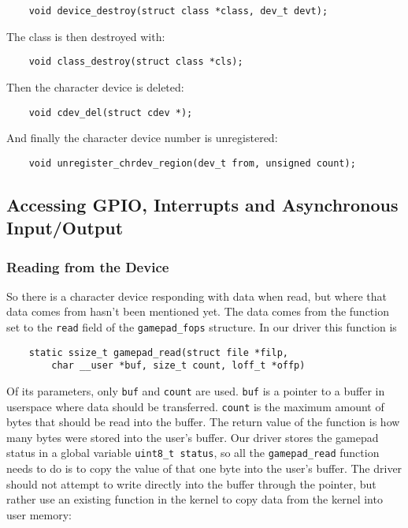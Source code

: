 \begin{lstlisting}
	void device_destroy(struct class *class, dev_t devt);
\end{lstlisting}

The class is then destroyed with:

\begin{lstlisting}
	void class_destroy(struct class *cls);
\end{lstlisting}

Then the character device is deleted:

\begin{lstlisting}
	void cdev_del(struct cdev *);
\end{lstlisting}

And finally the character device number is unregistered:

\begin{lstlisting}
	void unregister_chrdev_region(dev_t	from, unsigned count);
\end{lstlisting}

\subsection{Accessing GPIO, Interrupts and Asynchronous Input/Output}

\subsubsection{Reading from the Device}

So there is a character device responding with data when read, but where that
data comes from hasn't been mentioned yet. The data comes from the function set
to the \texttt{read} field of the \texttt{gamepad\_fops} structure. In our
driver this function is

\begin{lstlisting}
	static ssize_t gamepad_read(struct file *filp,
		char __user *buf, size_t count, loff_t *offp)
\end{lstlisting}

Of its parameters, only \texttt{buf} and \texttt{count} are used. \texttt{buf}
is a pointer to a buffer in userspace where data should be transferred.
\texttt{count} is the maximum amount of bytes that should be read into the
buffer. The return value of the function is how many bytes were stored into the
user's buffer. Our driver stores the gamepad status in a global variable
\texttt{uint8\_t status}, so all the \texttt{gamepad\_read} function needs to do
is to copy the value of that one byte into the user's buffer. The driver should
not attempt to write directly into the buffer through the pointer, but rather
use an existing function in the kernel to copy data from the kernel into user
memory:

